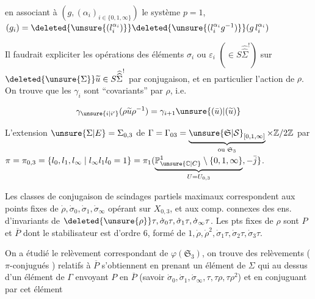 en associant à $(g,(\alpha_i)_{i\in\{0,1,\infty\}})$ le système  $p=1$, $(g_i)=\deleted{\unsure{(l_i^{\alpha_i})}}\deleted{\unsure{(l_i^{\alpha_i}g^{-1})}}(g\,l_i^{\alpha_i})$


Il faudrait expliciter les opérations des éléments $\sigma_i$ ou $\varepsilon_i$  $(\in S\widehat{\widehat\Sigma}^{!})$ sur $\deleted{\unsure{\Sigma}}\widetilde u\in S\widehat{\widehat\Sigma}^{!}$  par conjugaison, et en particulier l'action de $\rho$. On trouve que  les $\gamma_i$ sont ``covariants'' par $\rho$, i.e.

\[
\gamma_{\unsure{i|i'}}(\rho\widetilde u\rho^{-1})=\gamma_{i+1}\unsure{(\bar u)|(\widetilde u)}
\]


L'extension $\unsure{\Sigma|E}=\Sigma_{0,3}$ de $\Gamma=\Gamma_{03}=\underbrace{\unsure{\mathfrak S|\mathcal S}_{[0,1,\infty]}}_{\text{ou }\mathfrak S_3}\times\mathbb Z/2\mathbb Z$  par $\pi=\pi_{0,3}=\{l_0,l_1,l_\infty\mid l_\infty l_1l_0=1\}=\pi_1(\underbrace{\mathbb P^1_{\unsure{\mathbb C|C}}\setminus\{0,1,\infty\}}_{U=U_{0,3}},-\bar j\}$.

Les classes de conjugaison de scindages partiels maximaux  correspondent aux points fixes de $\dot\rho,\dot\sigma_0,\dot\sigma_1,\dot\sigma_\infty$ opérant sur $X_{0,3}$, et  aux comp. connexes des ens. d'invariants de $\deleted{\unsure{\rho}}\tau,\dot\sigma_0\tau,\dot\sigma_1\tau,\dot\sigma_\infty\tau$. Les pts fixes de $\rho$ sont $P$ et $\overline P$ dont le stabilisateur est d'ordre 6,  formé de $1,\dot\rho,\dot\rho^2,\dot\sigma_1\tau,\dot\sigma_2\tau,\dot\sigma_3\tau$.

On a étudié le relèvement correspondant  de $\varphi(\mathfrak S_3)$, on trouve des relèvements ($\pi$-conjugués ) relatifs à $\overline P$ s'obtiennent en  prenant un élément de $\Sigma$  qui  au dessus d'un élément de $\Gamma$ envoyant $P$ en $\overline P$ (savoir $\dot\sigma_0,\dot\sigma_1,\dot\sigma_\infty,\tau,\tau\rho,\tau\rho^2$) et en conjuguant par cet élément

